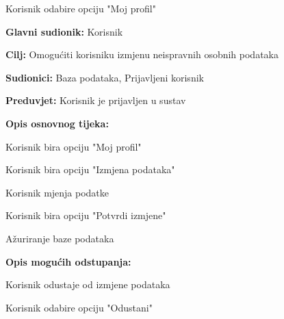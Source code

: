 \begin{packed_item}
\begin{packed_item}
						\item[] \begin{packed_enum}
							
							\item Korisnik odabire opciju "Moj profil"
					
						\end{packed_enum}
						
					\end{packed_item}
				
					\noindent {}
					\begin{packed_item}
						
						\item \textbf{Glavni sudionik: }Korisnik
						\item  \textbf{Cilj:} Omogućiti korisniku izmjenu neispravnih osobnih podataka
						\item  \textbf{Sudionici:} Baza podataka, Prijavljeni korisnik
						\item  \textbf{Preduvjet:} Korisnik je prijavljen u sustav
						\item  \textbf{Opis osnovnog tijeka:}
						
						\item[] \begin{packed_enum}
							
							\item Korisnik bira opciju "Moj profil"
							\item Korisnik bira opciju "Izmjena podataka"
							\item Korisnik mjenja podatke
							\item Korisnik bira opciju "Potvrdi izmjene"
							\item Ažuriranje baze podataka
						\end{packed_enum}
						
						\item  \textbf{Opis mogućih odstupanja:}
						
						\item[] \begin{packed_item}
							
							\item[2.a] Korisnik odustaje od izmjene podataka
							\item[] \begin{packed_enum}
								
								\item Korisnik odabire opciju "Odustani"
							

\end{packed_enum}
\end{packed_item}
\end{packed_item}
\end{packed_item}
